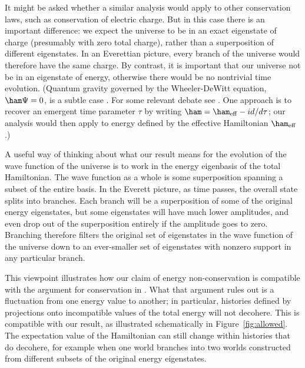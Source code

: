 \documentclass[12pt,aps,prd,onecolumn,nofootinbib,notitlepage]{revtex4-1}
\begin{document}
It might be asked whether a similar analysis would apply to other conservation laws, such as conservation of electric charge.
But in this case there is an important difference: we expect the universe to be in an exact eigenstate of charge (presumably with zero total charge), rather than a superposition of different eigenstates.
In an Everettian picture, every branch of the universe would therefore have the same charge.
By contrast, it is important that our universe not be in an eigenstate of energy, otherwise there would be no nontrivial time evolution.
(Quantum gravity governed by the Wheeler-DeWitt equation, $\ham\Psi = 0$, is a subtle case \cite{Halliwell:2002th}. 
For some relevant debate see \cite{Boddy:2014eba,Lloyd:2016ahu}. 
One approach is to recover an emergent time parameter $\tau$ by writing $\ham = \ham_\mathrm{eff} - i {d}/{d\tau}$; our analysis would then apply to energy defined by the effective Hamiltonian $\ham_\mathrm{eff}$.)

A useful way of thinking about what our result means for the evolution of the wave function of the universe is to work in the energy eigenbasis of the total Hamiltonian.
The wave function as a whole is some superposition spanning a subset of the entire basis.
In the Everett picture, as time passes, the overall state splits into branches.
Each branch will be a superposition of some of the original energy eigenstates, but some eigenstates will have much lower amplitudes, and even drop out of the superposition entirely if the amplitude goes to zero.
Branching therefore filters the original set of eigenstates in the wave function of the universe down to an ever-smaller set of eigenstates with nonzero support in any particular branch.

This viewpoint illustrates how our claim of energy non-conservation is compatible with the argument for conservation in \cite{griffiths,hartle1995conservation}.
What that argument rules out is a fluctuation from one energy value to another; in particular, histories defined by projections onto incompatible values of the total energy will not decohere.
This is compatible with our result, as illustrated schematically in Figure~\ref{fig:allowed}.
The expectation value of the Hamiltonian can still change within histories that do decohere, for example when one world branches into two worlds constructed from different subsets of the original energy eigenstates.
\end{document}
